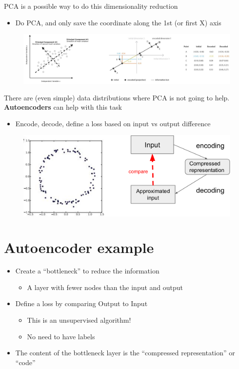 PCA is a possible way to do this dimensionality reduction
\begin{itemize}
	\item Do PCA, and only save the coordinate along the 1st (or first X) axis
\end{itemize}

\begin{figure}[ht]
	\centering
	\includegraphics[width=1\linewidth]{figure_ml/dim_reduction.png}
\end{figure}
\FloatBarrier

There are (even simple) data distributions where PCA is not going to help.\\
\textbf{Autoencoders} can help with this task
\begin{itemize}
	\item Encode, decode, define a loss based on input vs output difference
\end{itemize}

\begin{figure}[ht]
	\centering
	\includegraphics[width=0.65\linewidth]{figure_ml/autoencoder.png}
\end{figure}
\FloatBarrier

\section{Autoencoder example}

\begin{itemize}
	\item Create a “bottleneck” to reduce the
	information
	\begin{itemize}
		\item A layer with fewer nodes than the input
		and output
	\end{itemize}
	\item Define a loss by comparing Output to Input
	\begin{itemize}
		\item This is an unsupervised algorithm!
		\item No need to have labels
	\end{itemize}
	\item The content of the bottleneck layer is the	“compressed representation” or “code”
\end{itemize}

